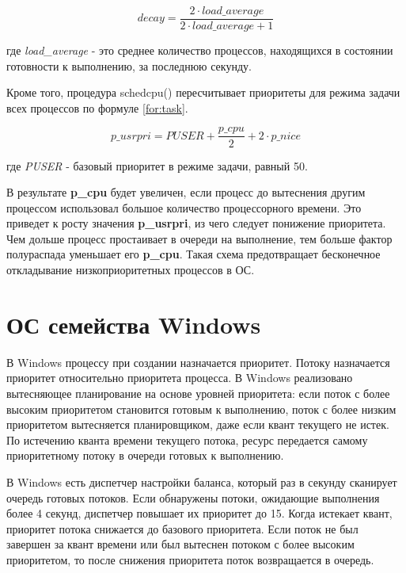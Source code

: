 \begin{equation}
    \label{for:bsd}
    decay = \frac{2 \cdot load\_average}{2 \cdot load\_average + 1}
\end{equation}

где \textit{load\_average} - это среднее количество процессов, находящихся в состоянии готовности к выполнению, за последнюю секунду.

Кроме того, процедура schedcpu() пересчитывает приоритеты для режима задачи всех процессов по формуле \eqref{for:task}.

\begin{equation}
    \label{for:task}
    p\_usrpri = PUSER + \frac{p\_cpu}{2} + 2 \cdot p\_nice
\end{equation}

где \textit{PUSER} - базовый приоритет в режиме задачи, равный 50.

В результате \textbf{p\_cpu} будет увеличен, если процесс до вытеснения другим процессом использовал большое количество процессорного времени. Это приведет к росту значения \textbf{p\_usrpri}, из чего следует понижение приоритета. Чем дольше процесс простаивает в очереди на выполнение, тем больше фактор
полураспада уменьшает его \textbf{p\_cpu}. Такая схема предотвращает бесконечное откладывание низкоприоритетных процессов в ОС.

\section{ОС семейства Windows}

В Windows процессу при создании назначается приоритет. Потоку назначается приоритет относительно приоритета процесса. В Windows реализовано вытесняющее планирование на основе уровней приоритета: если поток с более высоким приоритетом становится готовым к выполнению, поток с более низким приоритетом вытесняется планировщиком, даже если квант текущего не истек. По истечению кванта времени текущего потока, ресурс передается самому приоритетному потоку в очереди готовых к выполнению.

В Windows есть диспетчер настройки баланса, который раз в секунду сканирует очередь готовых потоков. Если обнаружены потоки, ожидающие выполнения более 4 секунд, диспетчер повышает их приоритет до 15. Когда истекает квант, приоритет потока снижается до базового приоритета. Если поток не был завершен за квант времени или был вытеснен потоком с более высоким приоритетом, то после снижения приоритета поток возвращается в очередь.

